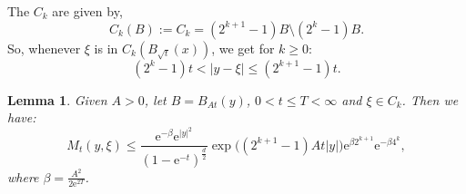 \documentclass[a4paper,oneside,10pt]{amsproc}
\newtheorem{lemma}{Lemma}
\theoremstyle{remark}
\renewcommand{\leq}{\leqslant}
\renewcommand{\leq}{\leqslant}
\renewcommand{\geq}{\geqslant}
\newcommand{\e}{\mathrm{e}} %
\renewcommand{\leq}{\leqslant}%
\renewcommand{\geq}{\geqslant}%
\begin{document}
The $C_k$ are given by,
\begin{equation}
  \label{eq:C_k-annulus-decomposition}
  C_k(B) := C_k = (2^{k + 1} - 1)B \setminus (2^k - 1)B.
\end{equation}
So, whenever $\xi$ is in $C_k(B_{\sqrt t}(x))$, we get for $k \geq 0$:
\begin{equation}
  \label{eq:C_k-annulus-decomposition-expand}
  (2^k - 1) t < |y - \xi| \leq (2^{k + 1} - 1) t.
\end{equation}

\begin{lemma}\label{lem:On-diagonal-kernel-estimates-on-Ck}
  Given $A > 0$, let $B = B_{At}(y)$, $0 < t \leq T < \infty$ and $\xi \in C_k$. Then we have:
  \begin{equation*}
    M_t(y, \xi) \leq \frac{\e^{-\beta} \e^{|y|^2}}{(1 - \e^{-t})^{\frac{d}2}}
    \exp\bigl((2^{k + 1} - 1) A t |y| \bigr) \e^{\beta 2^{k + 1}} \e^{-\beta 4^k},
  \end{equation*}
  where $\beta = \frac{A^2}{2 \e^{2T}}$.
\end{lemma}
\end{document}
